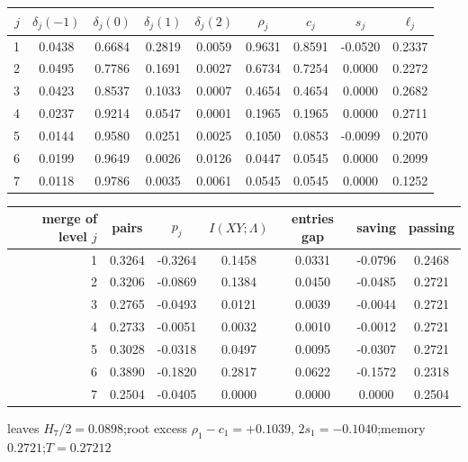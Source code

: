 \begin{tabular}{rcccccccc}
\toprule
$j$ & $\delta_j(-1)$ & $\delta_j(0)$ & $\delta_j(1)$ & $\delta_j(2)$ & $\rho_j$ & $c_j$ & $s_j$ & $\ell_j$ \\
\midrule
1 & 0.0438 & 0.6684 & 0.2819 & 0.0059 & 0.9631 & 0.8591 & -0.0520 & 0.2337 \\
2 & 0.0495 & 0.7786 & 0.1691 & 0.0027 & 0.6734 & 0.7254 & 0.0000 & 0.2272 \\
3 & 0.0423 & 0.8537 & 0.1033 & 0.0007 & 0.4654 & 0.4654 & 0.0000 & 0.2682 \\
4 & 0.0237 & 0.9214 & 0.0547 & 0.0001 & 0.1965 & 0.1965 & 0.0000 & 0.2711 \\
5 & 0.0144 & 0.9580 & 0.0251 & 0.0025 & 0.1050 & 0.0853 & -0.0099 & 0.2070 \\
6 & 0.0199 & 0.9649 & 0.0026 & 0.0126 & 0.0447 & 0.0545 & 0.0000 & 0.2099 \\
7 & 0.0118 & 0.9786 & 0.0035 & 0.0061 & 0.0545 & 0.0545 & 0.0000 & 0.1252 \\
\bottomrule
\end{tabular}

\medskip

\begin{tabular}{rcccccc}
\toprule
merge of level $j$ & pairs & $p_j$ & $I(XY;\Lambda)$ & entries gap & saving & passing \\
\midrule
1 & 0.3264 & -0.3264 & 0.1458 & 0.0331 & -0.0796 & 0.2468 \\
2 & 0.3206 & -0.0869 & 0.1384 & 0.0450 & -0.0485 & 0.2721 \\
3 & 0.2765 & -0.0493 & 0.0121 & 0.0039 & -0.0044 & 0.2721 \\
4 & 0.2733 & -0.0051 & 0.0032 & 0.0010 & -0.0012 & 0.2721 \\
5 & 0.3028 & -0.0318 & 0.0497 & 0.0095 & -0.0307 & 0.2721 \\
6 & 0.3890 & -0.1820 & 0.2817 & 0.0622 & -0.1572 & 0.2318 \\
7 & 0.2504 & -0.0405 & 0.0000 & 0.0000 & 0.0000 & 0.2504 \\
\bottomrule
\end{tabular}

\smallskip
{\footnotesize leaves $H_7/2 = 0.0898$;\quad root excess $\rho_1-c_1 = +0.1039$, $2s_1 = -0.1040$;\quad memory $0.2721$;\quad $T = 0.27212$}
